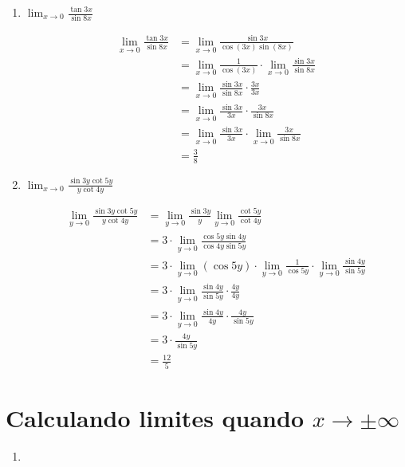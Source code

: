 \documentclass[a4paper, 12pt]{article}
\begin{document}
\begin{enumerate}
    \item $\lim_{x \to 0} \frac{\tan 3x}{\sin 8x}$
    
    \begin{align*}
        \lim_{x \to 0} \frac{\tan 3x}{\sin 8x} &= \lim_{x \to 0} \frac{\sin 3x}{\cos (3x)\sin (8x)}\\
        &= \lim_{x \to 0} \frac{1}{\cos (3x)} \cdot \lim_{x \to 0}\frac{\sin 3x}{\sin 8x}\\
        &= \lim_{x \to 0} \frac{\sin 3x}{\sin 8x} \cdot \frac{3x}{3x}\\
        &= \lim_{x \to 0} \frac{\sin 3x}{3x} \cdot \frac{3x}{\sin 8x}\\
        &= \lim_{x \to 0} \frac{\sin 3x}{3x} \cdot \lim_{x \to 0} \frac{3x}{\sin 8x}\\
        &= \frac{3}{8}
    \end{align*}

    \item $\lim_{x \to 0} \frac{\sin 3y \cot 5y}{y \cot 4y}$
    
    \begin{align*}
        \lim_{y \to 0} \frac{\sin 3y \cot 5y}{y \cot 4y} &= \lim_{y \to 0} \frac{\sin 3y}{y} \lim_{y \to 0} \frac{ \cot 5y}{ \cot 4y}\\
        &= 3\cdot \lim_{y \to 0} \frac{\cos 5y \sin 4y}{\cos 4y \sin 5y}\\
        &= 3\cdot \lim_{y \to 0} (\cos 5y) \cdot  \lim_{y \to 0} \frac{1}{\cos 5y } \cdot  \lim_{y \to 0} \frac{\sin 4y}{\sin 5y}\\
        &= 3 \cdot \lim_{y \to 0} \frac{\sin 4y}{\sin 5y} \cdot \frac{4y}{4y}\\
        &= 3 \cdot \lim_{y \to 0} \frac{\sin 4y}{4y} \cdot \frac{4y}{\sin 5y}\\
        &= 3 \cdot \frac{4y}{\sin 5y}\\
        &= \frac{12}{5}
    \end{align*}
\end{enumerate}

\newpage
\section*{Calculando limites quando $x \to \pm\infty$}
\begin{enumerate}\addtocounter{enumi}{36}
    \item 
\end{enumerate}
\end{document}

